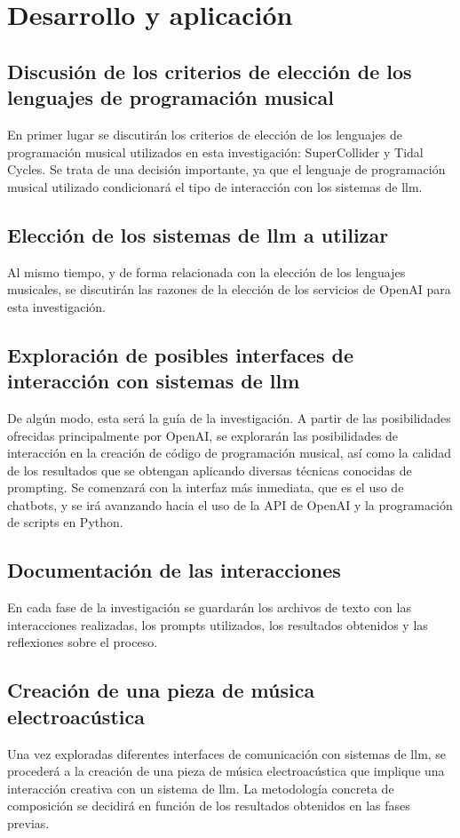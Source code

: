 \section{Desarrollo y aplicación}

\subsection{Discusión de los criterios de elección de los lenguajes de programación musical}
En primer lugar se discutirán los criterios de elección de los lenguajes de programación musical utilizados en esta investigación: SuperCollider y Tidal Cycles. Se trata de una decisión importante, ya que el lenguaje de programación musical utilizado condicionará el tipo de interacción con los sistemas de \gls{llm}.

\subsection{Elección de los sistemas de \gls{llm} a utilizar}
Al mismo tiempo, y de forma relacionada con la elección de los lenguajes musicales, se discutirán las razones de la elección de los servicios de OpenAI para esta investigación.


\subsection{Exploración de posibles interfaces de interacción con sistemas de \gls{llm}}
De algún modo, esta será la guía de la investigación. A partir de las posibilidades  ofrecidas principalmente por OpenAI, se explorarán las posibilidades de interacción en la creación de código de programación musical, así como la calidad de los resultados que se obtengan aplicando diversas técnicas conocidas de prompting. Se comenzará con la interfaz más inmediata, que es el uso de chatbots, y se irá avanzando hacia el uso de la API de OpenAI y la programación de scripts en Python.


\subsection{Documentación de las interacciones}
En cada fase de la investigación se guardarán los archivos de texto con las interacciones realizadas, los prompts utilizados, los resultados obtenidos y las reflexiones sobre el proceso.

\subsection{Creación de una pieza de música electroacústica}
Una vez exploradas diferentes interfaces de comunicación con sistemas de \gls{llm}, se procederá a la creación de una pieza de música electroacústica que implique una interacción creativa con un sistema de \gls{llm}. La metodología concreta de composición se decidirá en función de los resultados obtenidos en las fases previas.


